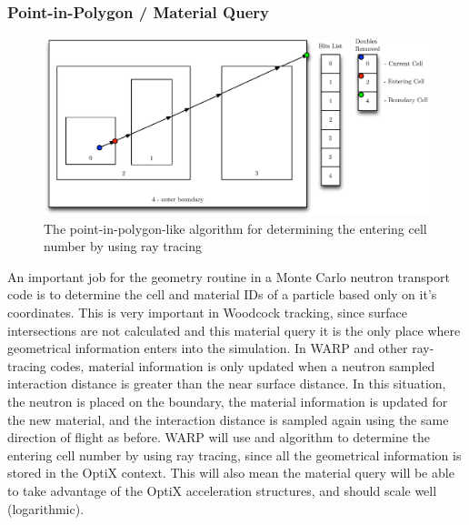 \subsubsection{Point-in-Polygon / Material Query}

\begin{figure}[h!] 
  \centering
    \includegraphics[width=1.0\textwidth]{graphics/whereami.eps}
     \caption{The point-in-polygon-like algorithm for determining the entering cell number by using ray tracing \label{whereami} }
\end{figure}

An important job for the geometry routine in a Monte Carlo neutron transport code is to determine the cell and material IDs of a particle based only on it's coordinates.  This is very important in Woodcock tracking, since surface intersections are not calculated and this material query it is the only place where geometrical information enters into the simulation.  In WARP and other ray-tracing codes, material information is only updated when a neutron sampled interaction distance is greater than the near surface distance.  In this situation, the neutron is placed on the boundary, the material information is updated for the new material, and the interaction distance is sampled again using the same direction of flight as before.  WARP will use and algorithm to determine the entering cell number by using ray tracing, since all the geometrical information is stored in the OptiX context.  This will also mean the material query will be able to take advantage of the OptiX acceleration structures, and should scale well (logarithmic).

